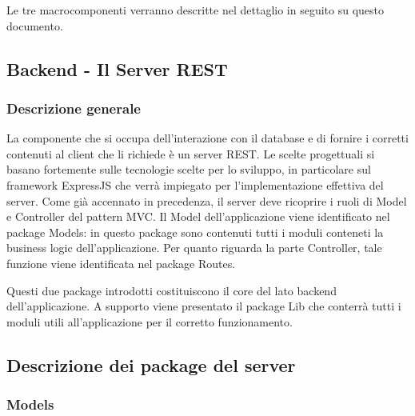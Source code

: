 Le tre macrocomponenti verranno descritte nel dettaglio in seguito su questo documento.

\subsection{Backend - Il Server REST}
\subsubsection{Descrizione generale}
La componente che si occupa dell'interazione con il database e di fornire i corretti contenuti al client che li richiede è un server REST.
Le scelte progettuali si basano fortemente sulle tecnologie scelte per lo sviluppo, in particolare sul framework ExpressJS che verrà impiegato per l'implementazione effettiva del server. Come già accennato in precedenza, il server deve ricoprire i ruoli di Model e Controller del pattern MVC.
Il Model dell'applicazione viene identificato nel package Models: in questo package sono contenuti tutti i moduli conteneti la business logic dell'applicazione.
Per quanto riguarda la parte Controller, tale funzione viene identificata nel package Routes.

Questi due package introdotti costituiscono il core del lato backend dell'applicazione. A supporto viene presentato il package Lib che conterrà tutti i moduli utili all'applicazione per il corretto funzionamento.





\subsection{Descrizione dei package del server} %
\subsubsection{Models}
